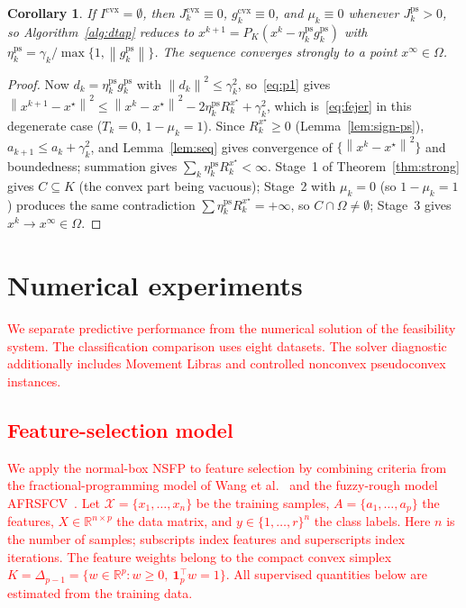 \documentclass[]{interact}
\theoremstyle{plain}
\newtheorem{corollary}[theorem]{Corollary}
\theoremstyle{definition}
\theoremstyle{remark}
\newcommand{\R}{\mathbb{R}}
\newcommand{\norm}[1]{\left\lVert #1 \right\rVert}
\newcommand{\cvx}{\mathrm{cvx}}
\newcommand{\ps}{\mathrm{ps}}
\begin{document}
\begin{corollary}\label{cor:ps}
If $I^{\cvx}=\emptyset$, then $J^{\cvx}_k\equiv0$, $g^{\cvx}_k\equiv0$, and $\mu_k\equiv0$
whenever $J^{\ps}_k>0$, so Algorithm~\ref{alg:dtap} reduces to
$x^{k+1}=P_K(x^k-\eta^{\ps}_k g^{\ps}_k)$ with $\eta^{\ps}_k=\gamma_k/\max\{1,\norm{g^{\ps}_k}\}$.
The sequence converges strongly to a point $x^\infty\in\Omega$.
\end{corollary}
\begin{proof}
Now $d_k=\eta^{\ps}_k g^{\ps}_k$ with $\norm{d_k}^2\le\gamma_k^2$, so~\eqref{eq:p1} gives
$\norm{x^{k+1}-x^\star}^2\le\norm{x^k-x^\star}^2-2\eta^{\ps}_k R^{x^\star}_k+\gamma_k^2$,
which is~\eqref{eq:fejer} in this degenerate case ($T_k=0$, $1-\mu_k=1$). Since
$R^{x^\star}_k\ge0$ (Lemma~\ref{lem:sign-ps}), $a_{k+1}\le a_k+\gamma_k^2$, and
Lemma~\ref{lem:seq} gives convergence of $\{\norm{x^k-x^\star}^2\}$ and boundedness;
summation gives $\sum_k\eta^{\ps}_k R^{x^\star}_k<\infty$. Stage~1 of
Theorem~\ref{thm:strong} gives $C\subseteq K$ (the convex part being vacuous); Stage~2 with
$\mu_k=0$ (so $1-\mu_k=1$) produces the same contradiction $\sum\eta^{\ps}_k R^{x^\star}_k=+\infty$,
so $C\cap\Omega\ne\emptyset$; Stage~3 gives $x^k\to x^\infty\in\Omega$.
\end{proof}


\section{Numerical experiments}\label{sec:experiments}
\leavevmode\textcolor{red}{We separate predictive performance from the numerical solution of the feasibility system. The classification comparison uses eight datasets. The solver diagnostic additionally includes Movement Libras and controlled nonconvex pseudoconvex instances.}

\subsection{\textcolor{red}{Feature-selection model}}\label{sec:fs}
\leavevmode\textcolor{red}{We apply the normal-box NSFP to feature selection by combining criteria from the fractional-programming model of Wang et al.~\citep{wang2021fractional} and the fuzzy-rough model AFRSFCV~\citep{wang2026afrsfcv}. Let $\mathcal{X}=\{x_1,\ldots,x_n\}$ be the training samples, $A=\{a_1,\ldots,a_p\}$ the features, $X\in\R^{n\times p}$ the data matrix, and $y\in\{1,\ldots,r\}^n$ the class labels. Here $n$ is the number of samples; subscripts index features and superscripts index iterations. The feature weights belong to the compact convex simplex $K=\Delta_{p-1}=\{w\in\R^p:w\ge0,\ \mathbf1_p^{\top}w=1\}$. All supervised quantities below are estimated from the training data.}
\end{document}
